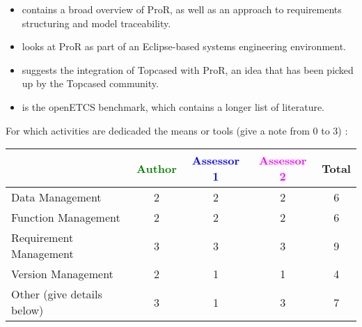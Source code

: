 \begin{itemize}

\item \cite{RMF_Mark_Book_Jastram_2013} contains a broad overview of ProR, as well as an approach to requirements structuring and model traceability.

\item \cite{jastram_forms_2012} looks at ProR as part of an Eclipse-based systems engineering environment.

\item \cite{topcase-JaGr2011} suggests the integration of Topcased with ProR, an idea that has been picked up by the Topcased community.

\item \cite{pror-benchmark} is the openETCS benchmark, which contains a longer list of literature.

\end{itemize}

For which activities are dedicaded the means or tools (give a note from 0 to  3) :

\begin{tabular}{|l | c | c | c | c|}
\hline
& \textcolor{green}{Author} & \textcolor{blue}{Assessor 1} & \textcolor{magenta}{Assessor 2} & Total \\
\hline
Data Management & 2 & 2 & 2 &  6 \\
\hline
Function Management & 2 & 2 & 2 & 6 \\
\hline
Requirement Management & 3 & 3 & 3 & 9 \\
\hline
Version Management & 2 & 1 & 1 & 4 \\
\hline
Other (give details below) & 3 & 1 & 3 & 7 \\
\hline
\end{tabular}

